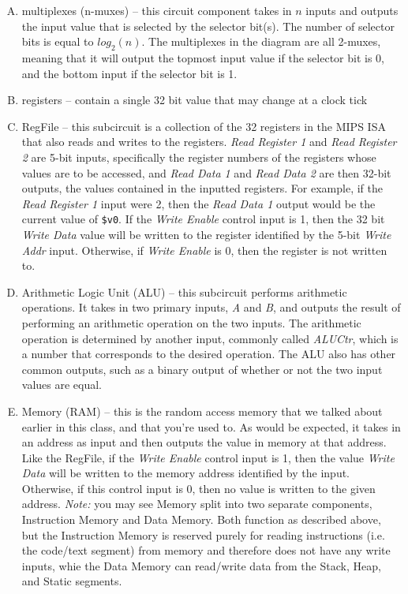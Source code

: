 \documentclass{article}
\begin{document}
\begin{enumerate}[A)]
\item multiplexes (n-muxes) -- this circuit component takes in $n$ inputs and outputs the input value that is selected by the selector bit(s). The number of selector bits is equal to $log_2(n)$. The multiplexes in the diagram are all 2-muxes, meaning that it will output the topmost input value if the selector bit is 0, and the bottom input if the selector bit is 1.
\item registers -- contain a single 32 bit value that may change at a clock tick
\item RegFile -- this subcircuit is a collection of the 32 registers in the MIPS ISA that also reads and writes to the registers. \textit{Read Register 1} and \textit{Read Register 2} are 5-bit inputs, specifically the register numbers of the registers whose values are to be accessed, and \textit{Read Data 1} and \textit{Read Data 2} are then 32-bit outputs, the values contained in the inputted registers. For example, if the \textit{Read Register 1} input were 2, then the \textit{Read Data 1} output would be the current value of \texttt{\$v0}. If the \textit{Write Enable} control input is 1, then the 32 bit \textit{Write Data} value will be written to the register identified by the 5-bit \textit{Write Addr} input. Otherwise, if \textit{Write Enable} is 0, then the register is not written to.
\item Arithmetic Logic Unit (ALU) -- this subcircuit performs arithmetic operations. It takes in two primary inputs, \textit{A} and \textit{B}, and outputs the result of performing an arithmetic operation on the two inputs. The arithmetic operation is determined by another input, commonly called \textit{ALUCtr}, which is a number that corresponds to the desired operation. The ALU also has other common outputs, such as a binary output of whether or not the two input values are equal.
\item Memory (RAM) -- this is the random access memory that we talked about earlier in this class, and that you're used to. As would be expected, it takes in an address as input and then outputs the value in memory at that address. Like the RegFile, if the \textit{Write Enable} control input is 1, then the value \textit{Write Data} will be written to the memory address identified by the input. Otherwise, if this control input is 0, then no value is written to the given address. \textit{Note:} you may see Memory split into two separate components, Instruction Memory and Data Memory. Both function as described above, but the Instruction Memory is reserved purely for reading instructions (i.e. the code/text segment) from memory and therefore does not have any write inputs, whie the Data Memory can read/write data from the Stack, Heap, and Static segments. 
\end{enumerate}
\end{document}

